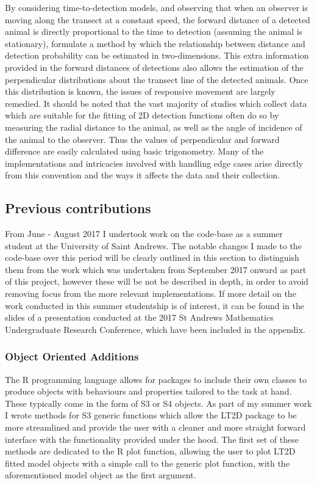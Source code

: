 \documentclass[11pt]{article}
\begin{document}
\begin{multicols}{2}
By considering time-to-detection models, and observing that when an observer is moving along the transect at a constant speed, the forward distance of a detected animal is directly proportional to the time to detection (assuming the animal is stationary), \cite{Borchers} formulate a method by which the relationship between distance and detection probability can be estimated in two-dimensions. This extra information provided in the forward distances of detections also allows the estimation of the perpendicular distributions about the transect line of the detected animals. Once this distribution is known, the issues of responsive movement are largely remedied. It should be noted that the vast majority of studies which collect data which are suitable for the fitting of 2D detection functions often do so by measuring the radial distance to the animal, as well as the angle of incidence of the animal to the observer. Thus the values of perpendicular and forward difference are easily calculated using basic trigonometry. Many of the implementations and intricacies involved with handling edge cases arise directly from this convention and the ways it affects the data and their collection.

\subsection{Previous contributions}

From June - August 2017 I undertook work on the code-base as a summer student at the University of Saint Andrews. The notable changes I made to the code-base over this period will be clearly outlined in this section to distinguish them from the work which was undertaken from September 2017 onward as part of this project, however these will be not be described in depth, in order to avoid removing focus from the more relevant implementations. If more detail on the work conducted in this summer studentship is of interest, it can be found in the slides of a presentation conducted at the 2017 St Andrews Mathematics Undergraduate Research Conference, which have been included in the appendix. 

\subsubsection{Object Oriented Additions}
The R programming language allows for packages to include their own classes to produce objects with behaviours and properties tailored to the task at hand. These typically come in the form of S3 or S4 objects. As part of my summer work I wrote methods for S3 generic functions which allow the LT2D package to be more streamlined and provide the user with a cleaner and more straight forward interface with the functionality provided under the hood. The first set of these methods are dedicated to the R plot function, allowing the user to plot LT2D fitted model objects with a simple call to the generic plot function, with the aforementioned model object as the first argument. 


\end{multicols}
\end{document}
